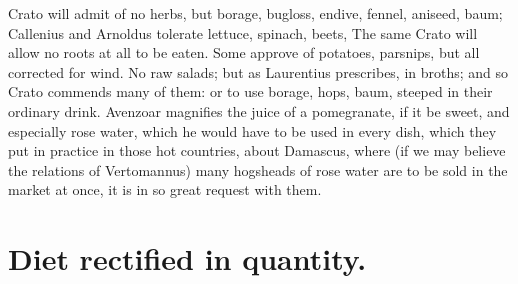 {Crato will admit of no herbs, but borage, bugloss, endive, fennel, aniseed, baum; Callenius and Arnoldus tolerate lettuce, spinach, beets, \etc{} The same Crato will allow no roots at all to be eaten. Some approve of potatoes, parsnips, but all corrected for wind. No raw salads; but as Laurentius prescribes, in broths; and so Crato commends many of them: or to use borage, hops, baum, steeped in their ordinary drink. Avenzoar magnifies the juice of a pomegranate, if it be sweet, and especially rose water, which he would have to be used in every dish, which they put in practice in those hot countries, about Damascus, where (if we may believe the relations of Vertomannus) many hogsheads of rose water are to be sold in the market at once, it is in so great request with them.

\section{Diet rectified in quantity.}

}
